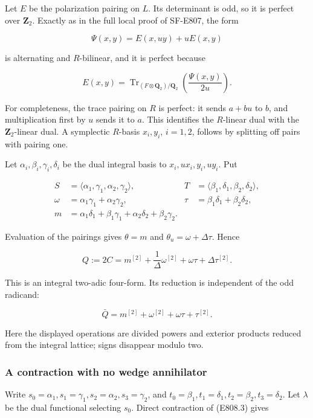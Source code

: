 Let \(E\) be the polarization pairing on \(L\). Its determinant is odd,
so it is perfect over \(\mathbf Z_2\). Exactly as in the full local
proof of SF-E807, the form

\[
 \Psi(x,y)=E(x,uy)+uE(x,y)
\]

is alternating and \(R\)-bilinear, and it is perfect because

\[
 E(x,y)=\operatorname{Tr}_{(F\otimes\mathbf Q_2)/\mathbf Q_2}
              \left(\frac{\Psi(x,y)}{2u}\right).
\]

For completeness, the trace pairing on \(R\) is perfect: it sends
\(a+bu\) to \(b\), and multiplication first by \(u\) sends it to \(a\).
This identifies the \(R\)-linear dual with the \(\mathbf Z_2\)-linear
dual. A symplectic \(R\)-basis \(x_i,y_i\), \(i=1,2\), follows by
splitting off pairs with pairing one.

Let \(\alpha_i,\beta_i,\gamma_i,\delta_i\) be the dual integral basis to
\(x_i,ux_i,y_i,uy_i\). Put

\[
 \begin{aligned}
 S&=\langle\alpha_1,\gamma_1,\alpha_2,\gamma_2\rangle,
 &T&=\langle\beta_1,\delta_1,\beta_2,\delta_2\rangle,\\
 \omega&=\alpha_1\gamma_1+\alpha_2\gamma_2,
 &\tau&=\beta_1\delta_1+\beta_2\delta_2,\\
 m&=\alpha_1\delta_1+\beta_1\gamma_1
       +\alpha_2\delta_2+\beta_2\gamma_2.
 \end{aligned}
\]

Evaluation of the pairings gives \(\theta=m\) and
\(\theta_u=\omega+\Delta\tau\). Hence

\[
 Q:=2C=m^{[2]}+\frac1\Delta\omega^{[2]}
            +\omega\tau+\Delta\tau^{[2]}.
 \tag{E808.2}
\]

This is an integral two-adic four-form. Its reduction is independent of
the odd radicand:

\[
 \bar Q=m^{[2]}+\omega^{[2]}+\omega\tau+\tau^{[2]}.
 \tag{E808.3}
\]

Here the displayed operations are divided powers and exterior products
reduced from the integral lattice; signs disappear modulo two.

\subsubsection{A contraction with no wedge
annihilator}\label{a-contraction-with-no-wedge-annihilator}

Write \(s_0=\alpha_1,s_1=\gamma_1,s_2=\alpha_2,s_3=\gamma_2\), and
\(t_0=\beta_1,t_1=\delta_1,t_2=\beta_2,t_3=\delta_2\). Let \(\lambda\)
be the dual functional selecting \(s_0\). Direct contraction of (E808.3)
gives

